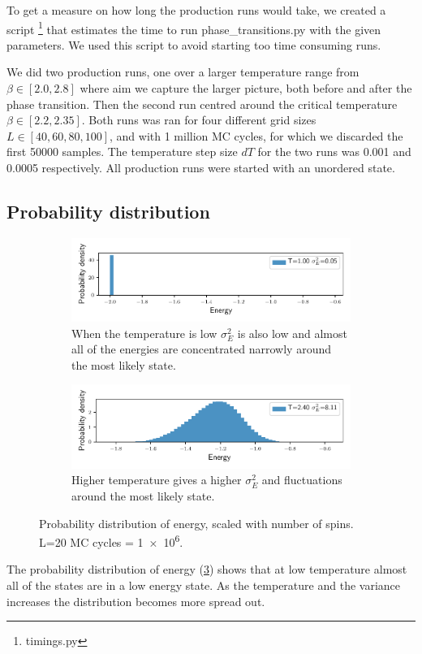 To get a measure on how long the production runs would take, we created a script
\footnote{timings.py} that estimates the time to
run phase\_transitions.py with the given parameters. We used this script  to
avoid starting too time consuming runs.

We did two production runs, one over a larger temperature range from $\beta \in
[2.0, 2.8]$ where aim we capture the larger picture, both before and after the
phase transition. Then the second run centred around the critical
temperature  $\beta \in [2.2, 2.35]$. Both runs was ran for four different grid
sizes $L \in [40,60,80,100]$, and with 1 million MC cycles, for which we
discarded the first 50000 samples. The temperature step size $dT$ for the two
runs was 0.001 and 0.0005 respectively. All production runs were started with
an unordered state.

\subsection{Probability distribution}

\begin{figure}[h]
  \begin{subfigure}[t]{\textwidth} %
    \centering
    \includegraphics[width=\linewidth]{../figures/distribution_0.pdf}
    \caption{When the temperature is low $\sigma_E^2$ is also low and almost all
    of the energies are concentrated narrowly around the most likely
    state.}
    \label{fig:sub-first}
  \end{subfigure}
  \hfill
  \newline
  \begin{subfigure}[t]{\textwidth}
    \centering
    \includegraphics[width=\linewidth]{../figures/distribution_5.pdf}
    \caption{Higher temperature gives a higher $\sigma_E^2$ and fluctuations around
    the most likely state.}
    \label{fig:sub-second}
  \end{subfigure}
  \label{fig:distribution}
  \caption{Probability distribution of energy, scaled with number of spins. L=20
  MC cycles = \num{1e6}.}
\end{figure}


The probability distribution of energy (\cref{fig:distribution}) shows that
at low temperature almost all of the states are in a low energy state.
As the temperature and the variance increases the distribution becomes more
spread out.
